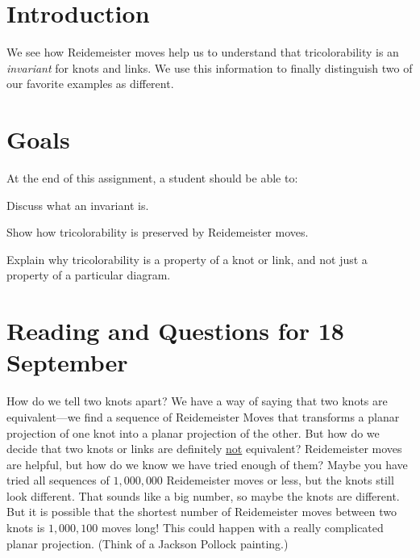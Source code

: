 \documentclass[12pt,letterpaper]{article}
\theoremstyle{definition}
\begin{document}
\setlength{\parskip}{1ex plus 0.5ex minus 0.2ex}
\setlength{\parindent}{0pt}

\pagestyle{fancy}
\cfoot{}

\section*{Introduction}
We see how Reidemeister moves help us to understand that tricolorability is an \emph{invariant} for knots and links. We use this information to finally distinguish two of our favorite examples as different.

\section*{Goals}
At the end of this assignment, a student should be able to:
\begin{compactitem}
\item Discuss what an invariant is.
\item Show how tricolorability is preserved by Reidemeister moves.
\item Explain why tricolorability is a property of a knot or link, and not just a property of a particular diagram.
\end{compactitem}


\section*{Reading and Questions for 18 September}

How do we tell two knots apart?
We have a way of saying that two knots are equivalent---we find a sequence of Reidemeister Moves that transforms a planar projection of one knot into a planar projection of the other.
But how do we decide that two  knots or links are definitely \underline{not} equivalent?
Reidemeister moves are helpful, but how do we know we have tried enough of them?
Maybe you have tried all sequences of $1,000,000$ Reidemeister moves or less, but the knots still look different.
That sounds like a big number, so maybe the knots are different.
But it is possible that the shortest number of Reidemeister moves between two knots is $1,000,100$ moves long!
This could happen with a really complicated planar projection.
(Think of a Jackson Pollock painting.)
\end{document}
